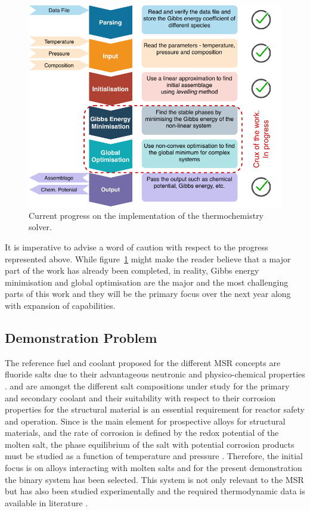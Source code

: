    \begin{figure}[h]
        \centering
        \includegraphics[scale=0.9]{figures/YJ_Progress.pdf}
        \caption{Current progress on the implementation of the thermochemistry solver.}
        \label{fig:progress}
    \end{figure}

	It is imperative to advise a word of caution with respect to the progress represented above. While figure~\ref{fig:progress} might make the reader believe that a major part of the work has already been completed, in reality, Gibbs energy minimisation and global optimisation are the major and the most challenging parts of this work and they will be the primary focus over the next year along with expansion of capabilities.

	\subsection{Demonstration Problem}
	The reference fuel and coolant proposed for the different MSR concepts are fluoride salts due to their advantageous neutronic and physico-chemical properties \cite{BENES2012359}.  and  are amongst the different salt compositions under study for the primary and secondary coolant and their suitability with respect to their corrosion properties for the structural material is an essential requirement for reactor safety and operation. Since  is the main element for prospective alloys for structural materials, and the rate of corrosion is defined by the redox potential of the molten salt, the phase equilibrium of the salt with potential corrosion products must be studied as a function of temperature and pressure \cite{OcadizFlores18}. Therefore, the initial focus is on  alloys interacting with molten  salts and for the present demonstration the  binary system has been selected. This system is not only relevant to the MSR but has also been studied experimentally and the required thermodynamic data is available in literature \cite{OcadizFlores18}.

